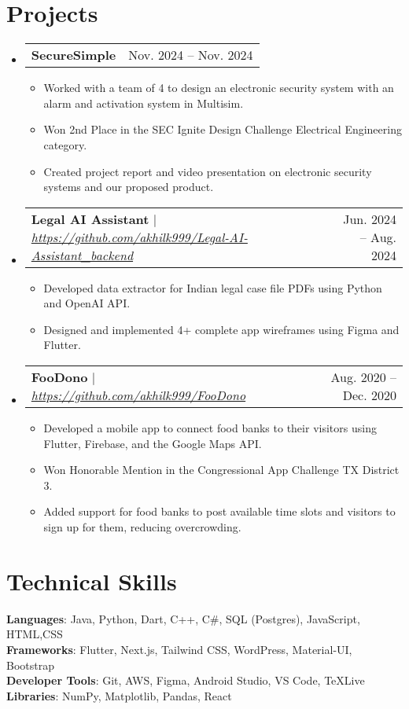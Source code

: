 \documentclass[letterpaper,11pt]{article}
\makeatletter
\newcommand{\resumeItem}[1]{
  \item\small{
    {#1 \vspace{-2pt}}
  }
}
\newcommand{\resumeProjectHeading}[2]{
    \item
    \begin{tabular*}{0.97\textwidth}{l@{\extracolsep{\fill}}r}
      \small#1 & #2 \\
    \end{tabular*}\vspace{-7pt}
}
\newcommand{\resumeSubHeadingListStart}{\begin{itemize}[leftmargin=0.15in, label={}]}
\newcommand{\resumeSubHeadingListEnd}{\end{itemize}}
\newcommand{\resumeItemListStart}{\begin{itemize}}
\newcommand{\resumeItemListEnd}{\end{itemize}\vspace{-5pt}}
\makeatother
\begin{document}
\section{Projects}
    \resumeSubHeadingListStart
      \resumeProjectHeading
          {\textbf{SecureSimple}}{Nov. 2024 -- Nov. 2024}
          \resumeItemListStart
            \resumeItem{Worked with a team of 4 to design an electronic security system with an alarm and activation system in Multisim.}
            \resumeItem{Won 2nd Place in the SEC Ignite Design Challenge Electrical Engineering category.}
            \resumeItem{Created project report and video presentation on electronic security systems and our proposed product.}
          \resumeItemListEnd
      \resumeProjectHeading
          {\textbf{Legal AI Assistant} $|$ \emph{\url{https://github.com/akhilk999/Legal-AI-Assistant_backend}}}{Jun. 2024 -- Aug. 2024}
          \resumeItemListStart
            \resumeItem{Developed data extractor for Indian legal case file PDFs using Python and OpenAI API.}
            \resumeItem{Designed and implemented 4+ complete app wireframes using Figma and Flutter.}
          \resumeItemListEnd
      \resumeProjectHeading
          {\textbf{FooDono} $|$ \emph{\url{https://github.com/akhilk999/FooDono}}}{Aug. 2020 -- Dec. 2020}
          \resumeItemListStart
            \resumeItem{Developed a mobile app to connect food banks to their visitors using Flutter, Firebase, and the Google Maps API.}
            \resumeItem{Won Honorable Mention in the Congressional App Challenge TX District 3.}
            \resumeItem{Added support for food banks to post available time slots and visitors to sign up for them, reducing overcrowding.}
          \resumeItemListEnd
    \resumeSubHeadingListEnd



%
\section{Technical Skills}
 \begin{itemize}[leftmargin=0.15in, label={}]
    \small{\item{
     \textbf{Languages}{: Java, Python, Dart, C++, C\#, SQL (Postgres), JavaScript, HTML,CSS} \\
     \textbf{Frameworks}{: Flutter, Next.js, Tailwind CSS, WordPress, Material-UI, Bootstrap} \\
     \textbf{Developer Tools}{: Git, AWS, Figma, Android Studio, VS Code, TeXLive} \\
     \textbf{Libraries}{: NumPy, Matplotlib, Pandas, React} \\
    }}
 \end{itemize}


\end{document}
